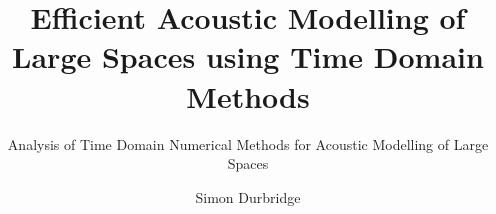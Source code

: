 \documentclass[graybox,envcountchap,sectrefs]{svmono}
\begin{document}
\author{Simon Durbridge} %

\title{Efficient Acoustic Modelling of Large Spaces using Time Domain Methods} %

\subtitle{Analysis of Time Domain Numerical Methods for Acoustic Modelling of Large Spaces}
\maketitle

\frontmatter%


%
%


\tableofcontents


\mainmatter%
%

\backmatter%
%
%
\printindex

\end{document}
